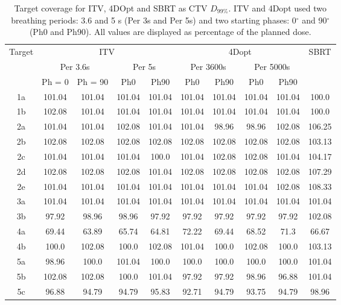 \begin{table}[H]
  \centering
  \caption{Target coverage for ITV, 4DOpt and SBRT as CTV $D_{99\%}$. ITV and 4Dopt used two breathing periods: 3.6 and 5 s (Per 3s and Per 5s) and
  two starting phases: 0$^\circ$ and 90$^\circ$ (Ph0 and Ph90). All values are displayed as percentage of the planned dose.}
  \begin{tabular}{c|c|c|c|c|c|c|c|c|c}
 \multirow{3}{*}{Target} & \multicolumn{4}{|c|}{ITV} & \multicolumn{4}{|c|}{4Dopt} & \multirow{3}{*}{SBRT}\\
  & \multicolumn{2}{|c|}{Per 3.6s} & \multicolumn{2}{|c|}{Per 5s} & \multicolumn{2}{|c|}{Per 3600s} & \multicolumn{2}{|c|}{Per 5000s} & \\
  & Ph = 0 & Ph = 90 & Ph0 & Ph90 & Ph0 & Ph90 & Ph0 & Ph90 & \\
 \hline \hline 
1a & 101.04 & 101.04 & 101.04 & 101.04 & 101.04 & 101.04 & 101.04 & 101.04 & 100.0 \\ 
 1b & 102.08 & 101.04 & 101.04 & 101.04 & 101.04 & 101.04 & 101.04 & 101.04 & 100.0 \\ 
  \hline 
2a & 101.04 & 101.04 & 102.08 & 101.04 & 101.04 & 98.96 & 98.96 & 102.08 & 106.25 \\ 
 2b & 102.08 & 102.08 & 102.08 & 102.08 & 102.08 & 102.08 & 102.08 & 102.08 & 103.13 \\ 
 2c & 101.04 & 101.04 & 101.04 & 100.0 & 101.04 & 102.08 & 102.08 & 101.04 & 104.17 \\ 
 2d & 102.08 & 102.08 & 102.08 & 101.04 & 102.08 & 102.08 & 102.08 & 102.08 & 107.29 \\ 
 2e & 101.04 & 101.04 & 101.04 & 101.04 & 101.04 & 101.04 & 101.04 & 102.08 & 108.33 \\ 
  \hline 
3a & 101.04 & 101.04 & 101.04 & 101.04 & 101.04 & 101.04 & 101.04 & 101.04 & 101.04 \\ 
 3b & 97.92 & 98.96 & 98.96 & 97.92 & 97.92 & 97.92 & 97.92 & 97.92 & 102.08 \\ 
  \hline 
4a & 69.44 & 63.89 & 65.74 & 64.81 & 72.22 & 69.44 & 68.52 & 71.3 & 66.67 \\ 
 4b & 100.0 & 102.08 & 100.0 & 102.08 & 101.04 & 100.0 & 102.08 & 100.0 & 103.13 \\ 
  \hline 
5a & 98.96 & 100.0 & 101.04 & 100.0 & 100.0 & 100.0 & 100.0 & 100.0 & 101.04 \\ 
 5b & 102.08 & 102.08 & 100.0 & 101.04 & 97.92 & 97.92 & 98.96 & 96.88 & 101.04 \\ 
 5c & 96.88 & 94.79 & 94.79 & 95.83 & 92.71 & 94.79 & 93.75 & 94.79 & 98.96 \\ 

\end{tabular}
\end{table}
